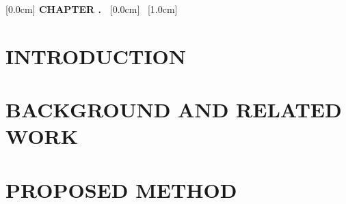 \documentclass[a4paper,twoside]{report}
\theoremstyle{definition}
\begin{document}
\hypersetup{pageanchor=false}



\pagestyle{empty}
\newpage
{}


\newpage
{}


\newpage
{}
\renewcommand*\contentsname{TABLE OF CONTENTS}
[0.0cm]{\bfseries\vspace{0.3cm}}{{\bfseries{\scshape} CHAPTER \thecontentslabel.\ }}{}{\contentspage}
[0.0cm]{\vspace{0.3cm}}{\thecontentslabel\ }{}{\contentspage}
[1.0cm]{\vspace{0.3cm}}{\thecontentslabel\ }{}{\contentspage}
\tableofcontents
\thispagestyle{empty}
\cleardoublepage

\hypersetup{pageanchor=true}
\renewcommand{\listfigurename}{LIST OF FIGURES}
{\let\oldnumberline\numberline\renewcommand{\numberline}{Figure~\oldnumberline}\listoffigures}
\newpage
\renewcommand{\listtablename}{LIST OF TABLES}
{\let\oldnumberline\numberline\renewcommand{\numberline}{Table~\oldnumberline}\listoftables}
\newpage
\glsaddall
\renewcommand*{\acronymname}{LIST OF ABBREVIATIONS}
\renewcommand*{\entryname}{Abbreviation}
\renewcommand*{\descriptionname}{Definition}
\printnoidxglossary[type=\acronymtype]

\renewcommand{\figurename}{Figure}
\renewcommand{\tablename}{Table}
\renewcommand{\chaptername}{CHAPTER}

\newpage
{}
\pagestyle{fancy}
\fancyhf{}
\fancyhead[RE,LO]{\leftmark}
\fancyfoot[RE,LO]{\thepage}

\chapter{INTRODUCTION}


\newpage
\chapter{BACKGROUND AND RELATED WORK}


\newpage
\chapter{PROPOSED METHOD}

\end{document}
